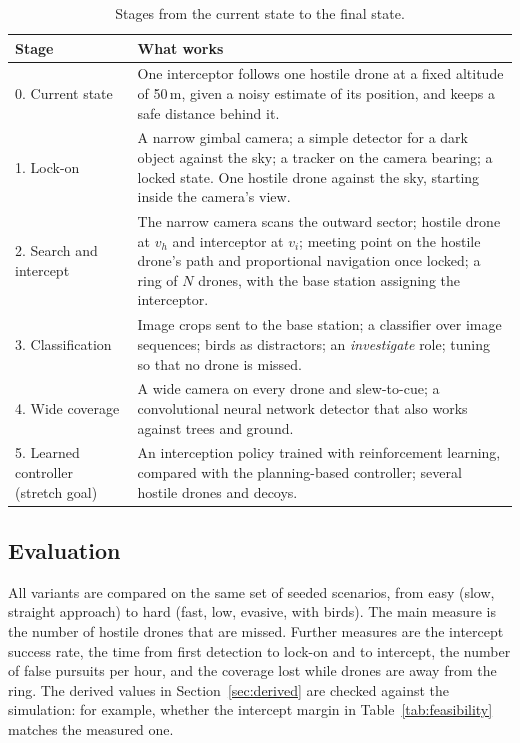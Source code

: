 \documentclass{article}
\begin{document}
\begin{table}[H]
\centering
\small
\begin{tabular}{|p{}|p{}|}
\hline
\textbf{Stage} & \textbf{What works} \\
\hline
0. Current state &
One interceptor follows one hostile drone at a fixed altitude of 50\,m,
given a noisy estimate of its position, and keeps a safe distance behind it. \\
\hline
1. Lock-on &
A narrow gimbal camera; a simple detector for a dark object against the sky;
a tracker on the camera bearing; a locked state. One hostile drone against
the sky, starting inside the camera's view. \\
\hline
2. Search and intercept &
The narrow camera scans the outward sector; hostile drone at $v_h$ and
interceptor at $v_i$; meeting point on the hostile drone's path and
proportional navigation once locked; a ring of $N$ drones, with the base
station assigning the interceptor. \\
\hline
3. Classification &
Image crops sent to the base station; a classifier over image sequences;
birds as distractors; an \emph{investigate} role; tuning so that no drone is
missed. \\
\hline
4. Wide coverage &
A wide camera on every drone and slew-to-cue; a convolutional neural network
detector that also works against trees and ground. \\
\hline
5. Learned controller (stretch goal) &
An interception policy trained with reinforcement learning, compared with the
planning-based controller; several hostile drones and decoys. \\
\hline
\end{tabular}
\caption{Stages from the current state to the final state.}
\label{tab:stages}
\end{table}

\subsection{Evaluation}

All variants are compared on the same set of seeded scenarios, from easy
(slow, straight approach) to hard (fast, low, evasive, with birds). The main
measure is the number of hostile drones that are missed. Further measures are
the intercept success rate, the time from first detection to lock-on and to
intercept, the number of false pursuits per hour, and the coverage lost while
drones are away from the ring. The derived values in
Section~\ref{sec:derived} are checked against the simulation: for example,
whether the intercept margin in Table~\ref{tab:feasibility} matches the
measured one.
\end{document}

